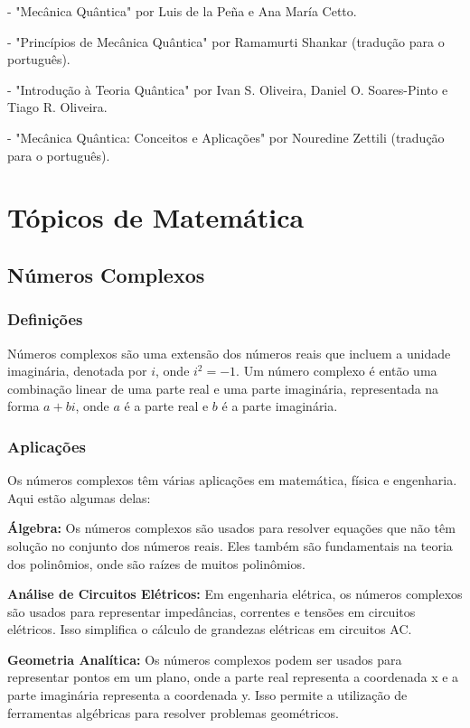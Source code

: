 \documentclass[12pt]{article}
\begin{document}
- "Mecânica Quântica" por Luis de la Peña e Ana María Cetto.

- "Princípios de Mecânica Quântica" por Ramamurti Shankar (tradução para o português).

- "Introdução à Teoria Quântica" por Ivan S. Oliveira, Daniel O. Soares-Pinto e Tiago R. Oliveira.

- "Mecânica Quântica: Conceitos e Aplicações" por Nouredine Zettili (tradução para o português).

\newpage
\section{Tópicos de Matemática}

\subsection{Números Complexos}

\subsubsection{Definições}

Números complexos são uma extensão dos números reais que incluem a unidade imaginária, denotada por $i$, onde $i^2 = -1$. Um número complexo é então uma combinação linear de uma parte real e uma parte imaginária, representada na forma $a + bi$, onde $a$ é a parte real e $b$ é a parte imaginária.

\subsubsection{Aplicações}

Os números complexos têm várias aplicações em matemática, física e engenharia. Aqui estão algumas delas:

\textbf{Álgebra:} Os números complexos são usados para resolver equações que não têm solução no conjunto dos números reais. Eles também são fundamentais na teoria dos polinômios, onde são raízes de muitos polinômios.

\textbf{Análise de Circuitos Elétricos:} Em engenharia elétrica, os números complexos são usados para representar impedâncias, correntes e tensões em circuitos elétricos. Isso simplifica o cálculo de grandezas elétricas em circuitos AC.

\textbf{Geometria Analítica:} Os números complexos podem ser usados para representar pontos em um plano, onde a parte real representa a coordenada x e a parte imaginária representa a coordenada y. Isso permite a utilização de ferramentas algébricas para resolver problemas geométricos.
\end{document}
